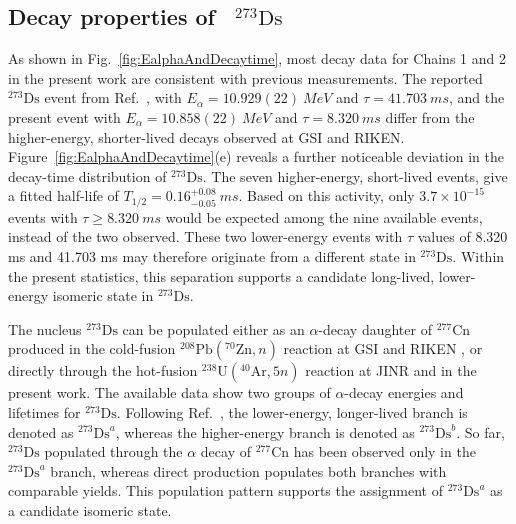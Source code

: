 \documentclass[aps,prc,reprint,superscriptaddress,floatfix]{revtex4-2}
\begin{document}
\subsection{\texorpdfstring{Decay properties of~ $^{273}\mathrm{Ds}$}{Decay properties of 273Ds}}

As shown in Fig.~\ref{fig:EalphaAndDecaytime}, most decay data for Chains 1 and 2 in the present work are consistent with previous measurements. The reported $^{273}\mathrm{Ds}$ event from Ref.~\cite{oganessian2024SynthesisDecayProperties}, with $E_{\alpha} = 10.929(22)~\si{MeV}$ and $\tau = 41.703~\si{ms}$, and the present event with $E_{\alpha} = 10.858(22)~\si{MeV}$ and $\tau = 8.320~\si{ms}$ differ from the higher-energy, shorter-lived decays observed at GSI and RIKEN. Figure~\ref{fig:EalphaAndDecaytime}(e) reveals a further noticeable deviation in the decay-time distribution of $^{273}\mathrm{Ds}$. The seven higher-energy, short-lived events, give a fitted half-life of $T_{1/2}=0.16^{+0.08}_{-0.05}~\si{ms}$. Based on this activity, only $3.7\times10^{-15}$ events with $\tau \geq 8.320~\si{ms}$ would be expected among the nine available events, instead of the two observed. These two lower-energy events with $\tau$ values of 8.320 ms and 41.703 ms may therefore originate from a different state in $^{273}\mathrm{Ds}$. Within the present statistics, this separation supports a candidate long-lived, lower-energy isomeric state in $^{273}\mathrm{Ds}$.

The nucleus $^{273}\mathrm{Ds}$ can be populated either as an $\alpha$-decay daughter of $^{277}\mathrm{Cn}$ produced in the cold-fusion $^{208}\mathrm{Pb}(^{70}\mathrm{Zn}, n)$ reaction at GSI \cite{hofmann2002NewResultsElements,hofmann1996NewElement112} and RIKEN \cite{sumita2013NewResultProduction,morita2007ExperimentSynthesisIsotope277}, or directly through the hot-fusion $^{238}\mathrm{U}(^{40}\mathrm{Ar}, 5n)$ reaction at JINR \cite{oganessian2024SynthesisDecayProperties} and in the present work. The available data show two groups of $\alpha$-decay energies and lifetimes for $^{273}\mathrm{Ds}$. Following Ref.~\cite{oganessian2024SynthesisDecayProperties}, the lower-energy, longer-lived branch is denoted as $^{273}\mathrm{Ds}^{a}$, whereas the higher-energy branch is denoted as $^{273}\mathrm{Ds}^{b}$. So far, $^{273}\mathrm{Ds}$ populated through the $\alpha$ decay of $^{277}\mathrm{Cn}$ has been observed only in the $^{273}\mathrm{Ds}^{a}$ branch, whereas direct production populates both branches with comparable yields. This population pattern supports the assignment of $^{273}\mathrm{Ds}^{a}$ as a candidate isomeric state.
\end{document}
